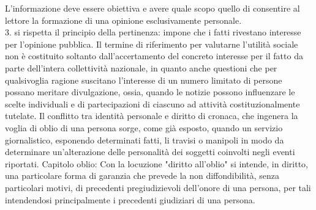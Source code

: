 L'informazione deve essere obiettiva e avere quale scopo quello di consentire al lettore la formazione di una opinione esclusivamente personale.
\\3. si rispetta il principio della pertinenza: impone che i fatti rivestano interesse per l'opinione pubblica. Il termine di riferimento per valutarne l'utilità sociale non è costituito soltanto dall'accertamento del concreto interesse per il fatto da parte dell'intera collettività nazionale, in quanto anche questioni che per qualsivoglia ragione suscitano l'interesse di un numero limitato di persone possano meritare divulgazione, ossia, quando le notizie possono influenzare le scelte individuali e di partecipazioni di ciascuno ad attività costituzionalmente tutelate. %
Il conflitto tra identità personale e diritto di cronaca, che ingenera la voglia di oblio di una persona sorge, come già esposto, quando un servizio giornalistico, esponendo determinati fatti, li travisi o manipoli in modo da determinare un'alterazione delle personalità dei soggetti coinvolti negli eventi riportati. %
Capitolo oblio:
Con la locuzione "diritto all'oblio" si intende, in diritto, una particolare forma di garanzia che prevede la non diffondibilità, senza particolari motivi, di precedenti pregiudizievoli dell'onore di una persona, per tali intendendosi principalmente i precedenti giudiziari di una persona.

